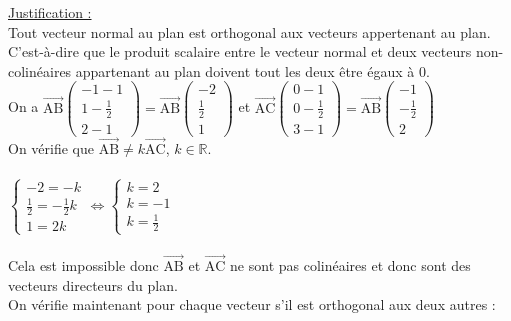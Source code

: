 \documentclass[a4paper, 12pt]{article}
\begin{document}
\noindent
\underline{Justification :}
\\
Tout vecteur normal au plan est orthogonal aux vecteurs appertenant au plan. 
C'est-à-dire que le produit scalaire entre le vecteur normal et deux vecteurs non-colinéaires appartenant au plan doivent tout les deux être égaux à 0.
\\
On a $\overrightarrow{\text{AB}}\begin{pmatrix}-1-1\\1-\frac{1}{2} \\ 2-1\end{pmatrix} = \overrightarrow{\text{AB}}\begin{pmatrix} -2 \\ \frac{1}{2} \\ 1\end{pmatrix}$ et 
$\overrightarrow{\text{AC}}\begin{pmatrix} 0-1 \\ 0- \frac{1}{2} \\ 3-1 \end{pmatrix} = \overrightarrow{\text{AB}}\begin{pmatrix} -1 \\ -\frac{1}{2} \\ 2 \end{pmatrix}$
\\
On vérifie que $\overrightarrow{\text{AB}} \neq k\overrightarrow{\text{AC}}$, $k \in \mathds{R}$.
\\ \\
$\begin{cases} -2 = -k \\ \frac{1}{2} = -\frac{1}{2}k \\ 1 = 2k \end{cases} \iff \begin{cases}k = 2 \\ k = -1 \\ k = \frac{1}{2} \end{cases}$ 
\\ \\
Cela est impossible donc $\overrightarrow{\text{AB}}$ et $\overrightarrow{\text{AC}}$ ne sont pas colinéaires et donc sont des vecteurs directeurs du plan. 
\\
On vérifie maintenant pour chaque vecteur s'il est orthogonal aux deux autres :
\vspace{3mm}
\end{document}
